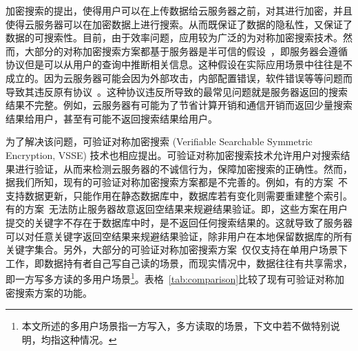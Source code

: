 加密搜索的提出，使得用户可以在上传数据给云服务器之前，对其进行加密，并且使得云服务器可以在加密数据上进行搜索。从而既保证了数据的隐私性，又保证了数据的可搜索性。目前，由于效率问题，应用较为广泛的为对称加密搜索技术。然而，大部分的对称加密搜索方案都基于服务器是半可信的假设~\cite{curtmola2011searchable, kamara2012dynamic, cash2014dynamic}，即服务器会遵循协议但是可以从用户的查询中推断相关信息。这种假设在实际应用场景中往往是不成立的。因为云服务器可能会因为外部攻击，内部配置错误，软件错误等等问题而导致其违反原有协议~\cite{sun2015catch,bost2016verifiable}。这种协议违反所导致的最常见问题就是服务器返回的搜索结果不完整。例如，云服务器有可能为了节省计算开销和通信开销而返回少量搜索结果给用户，甚至有可能不返回搜索结果给用户。


为了解决该问题，可验证对称加密搜索 (Verifiable Searchable Symmetric Encryption, VSSE) 技术也相应提出\cite{kamara2011cs2,kurosawa2012uc,chai2012verifiable,kurosawa2013update,stefanov2014practical,cheng2015verifiable,bost2016verifiable,ogataefficient}。可验证对称加密搜索技术允许用户对搜索结果进行验证，从而来检测云服务器的不诚信行为，保障加密搜索的正确性。然而，据我们所知，现有的可验证对称加密搜索方案都是不完善的。例如，有的方案~\cite{kurosawa2012uc,chai2012verifiable,cheng2015verifiable,ogataefficient}不支持数据更新，只能作用在静态数据库中，数据库若有变化则需要重建整个索引。有的方案~\cite{kamara2011cs2,kurosawa2013update,stefanov2014practical}无法防止服务器故意返回空结果来规避结果验证。即，这些方案\cite{kamara2011cs2,kurosawa2013update,stefanov2014practical}在用户提交的关键字不存在于数据库中时，是不返回任何搜索结果的。这就导致了服务器可以对任意关键字返回空结果来规避结果验证，除非用户在本地保留数据库的所有关键字集合。另外，大部分的可验证对称加密搜索方案~\cite{kamara2011cs2,kurosawa2012uc,chai2012verifiable,kurosawa2013update,stefanov2014practical,
cheng2015verifiable,ogataefficient,bost2016verifiable}仅仅支持在单用户场景下工作，即数据持有者自己写自己读的场景，而现实情况中，数据往往有共享需求，即一方写多方读的多用户场景\footnote{本文所述的多用户场景指一方写入，多方读取的场景，下文中若不做特别说明，均指这种情况。}。表格~\ref{tab:comparison}比较了现有可验证对称加密搜索方案的功能。



